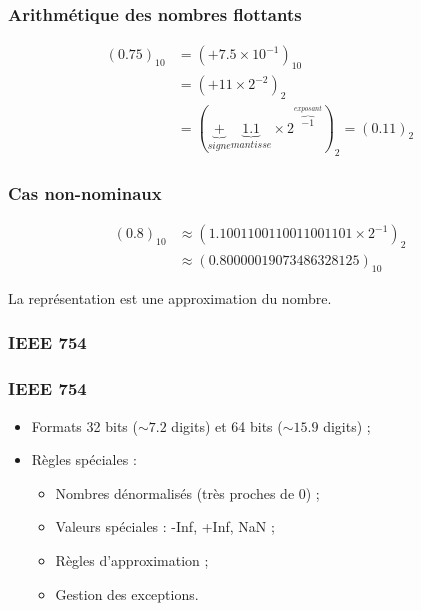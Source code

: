 \documentclass{beamer}
\begin{document}
\begin{frame}
    \frametitle{Arithmétique des nombres flottants}

    \begin{displaymath}
        \begin{split}
            (0.75)_{10} & = (+ 7.5 \times 10^{-1})_{10} \\
            & = (+11 \times 2^{-2})_{2} \\
            & = (\underbrace{+}_{signe} \underbrace{1.1}_{mantisse} \times 2^{\overbrace{-1}^{exposant}})_{2} = (0.11)_{2}
        \end{split}
    \end{displaymath}
\end{frame}

\begin{frame}
    \frametitle{Cas non-nominaux}

    \begin{displaymath}
        \begin{split}
            (0.8)_{10} & \approx (1.1001100110011001101 \times 2^{-1})_{2} \\
            & \approx (0.80000019073486328125)_{10}
        \end{split}
    \end{displaymath}

    La représentation est une approximation du nombre.
\end{frame}

\subsubsection{IEEE 754}

\begin{frame}
    \frametitle{IEEE 754}

    \begin{itemize}
        \item Formats 32 bits ($\sim 7.2$ digits) et 64 bits ($\sim 15.9$ digits) ;
        \item Règles spéciales :
              \begin{itemize}
                  \item Nombres dénormalisés (très proches de $0$) ;
                  \item Valeurs spéciales : -Inf, +Inf, NaN ;
                  \item Règles d'approximation ;
                  \item Gestion des exceptions.
              \end{itemize}
    \end{itemize}
\end{frame}
\end{document}
